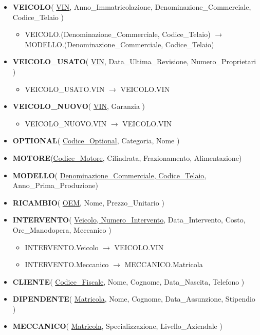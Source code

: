 \begin{itemize}
    \item \textbf{VEICOLO}( \underline{VIN}, Anno\_Immatricolazione, Denominazione\_Commerciale, Codice\_Telaio ) 
    \begin{itemize}
        \item VEICOLO.(Denominazione\_Commerciale, Codice\_Telaio) $\rightarrow$ MODELLO.(Denominazione\_Commerciale, Codice\_Telaio)
    \end{itemize}
    \item \textbf{VEICOLO\_USATO}( \underline{VIN}, Data\_Ultima\_Revisione, Numero\_Proprietari )
    \begin{itemize}
        \item VEICOLO\_USATO.VIN $\rightarrow$ VEICOLO.VIN
    \end{itemize}
    \item \textbf{VEICOLO\_NUOVO}( \underline{VIN}, Garanzia )
    \begin{itemize}
        \item VEICOLO\_NUOVO.VIN $\rightarrow$ VEICOLO.VIN
    \end{itemize}
    \item \textbf{OPTIONAL}( \underline{Codice\_Optional}, Categoria, Nome )
    \item \textbf{MOTORE}(\underline{Codice\_Motore}, Cilindrata, Frazionamento, Alimentazione)
    \item \textbf{MODELLO}( \underline{Denominazione\_Commerciale, Codice\_Telaio}, Anno\_Prima\_Produzione)
    \item \textbf{RICAMBIO}( \underline{OEM}, Nome, Prezzo\_Unitario )
    \item \textbf{INTERVENTO}( \underline{Veicolo, Numero\_Intervento}, Data\_Intervento, Costo, Ore\_Manodopera, Meccanico )
    \begin{itemize}
        \item INTERVENTO.Veicolo $\rightarrow$ VEICOLO.VIN
        \item INTERVENTO.Meccanico $\rightarrow$ MECCANICO.Matricola
    \end{itemize}
    \item \textbf{CLIENTE}( \underline{Codice\_Fiscale}, Nome, Cognome, Data\_Nascita, Telefono )
    \item \textbf{DIPENDENTE}( \underline{Matricola}, Nome, Cognome, Data\_Assunzione, Stipendio )
    \item \textbf{MECCANICO}( \underline{Matricola}, Specializzazione, Livello\_Aziendale )
    \begin{itemize}

\end{itemize}
\end{itemize}

